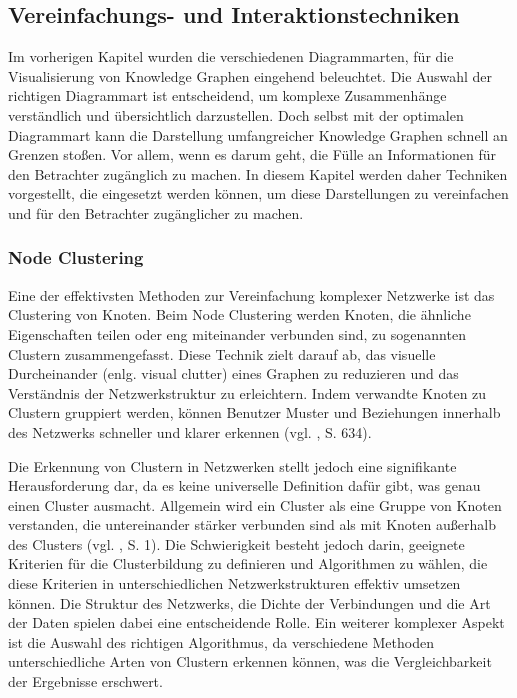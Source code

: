 \subsection{Vereinfachungs- und Interaktionstechniken}

Im vorherigen Kapitel wurden die verschiedenen Diagrammarten, für die Visualisierung von Knowledge Graphen eingehend beleuchtet. Die Auswahl der richtigen Diagrammart ist entscheidend, um komplexe Zusammenhänge verständlich und übersichtlich darzustellen. Doch selbst mit der optimalen Diagrammart kann die Darstellung umfangreicher Knowledge Graphen schnell an Grenzen stoßen. Vor allem, wenn es darum geht, die Fülle an Informationen für den Betrachter zugänglich zu machen. In diesem Kapitel werden daher Techniken vorgestellt, die eingesetzt werden können, um diese Darstellungen zu vereinfachen und für den Betrachter zugänglicher zu machen.

\subsubsection{Node Clustering}

Eine der effektivsten Methoden zur Vereinfachung komplexer Netzwerke ist das Clustering von Knoten. Beim Node Clustering werden Knoten, die ähnliche Eigenschaften teilen oder eng miteinander verbunden sind, zu sogenannten Clustern zusammengefasst. Diese Technik zielt darauf ab, das visuelle Durcheinander (enlg. visual clutter) eines Graphen zu reduzieren und das Verständnis der Netzwerkstruktur zu erleichtern. Indem verwandte Knoten zu Clustern gruppiert werden, können Benutzer Muster und Beziehungen innerhalb des Netzwerks schneller und klarer erkennen (vgl. \cite{chen:SurveyGraphVisualization}, S. 634).

Die Erkennung von Clustern in Netzwerken stellt jedoch eine signifikante Herausforderung dar, da es keine universelle Definition dafür gibt, was genau einen Cluster ausmacht. Allgemein wird ein Cluster als eine Gruppe von Knoten verstanden, die untereinander stärker verbunden sind als mit Knoten außerhalb des Clusters (vgl. \cite{clustering:AlgosForClust}, S. 1). Die Schwierigkeit besteht jedoch darin, geeignete Kriterien für die Clusterbildung zu definieren und Algorithmen zu wählen, die diese Kriterien in unterschiedlichen Netzwerkstrukturen effektiv umsetzen können. Die Struktur des Netzwerks, die Dichte der Verbindungen und die Art der Daten spielen dabei eine entscheidende Rolle. Ein weiterer komplexer Aspekt ist die Auswahl des richtigen Algorithmus, da verschiedene Methoden unterschiedliche Arten von Clustern erkennen können, was die Vergleichbarkeit der Ergebnisse erschwert.

